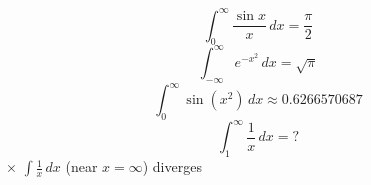 \documentclass[11pt,a4paper]{article}
\theoremstyle{plain}
\theoremstyle{definition}
\theoremstyle{remark}
\begin{document}
\begin{equation*}
  \int_0^{\infty} \frac{\sin x}{x}\,dx = \frac{\pi}{2}
\end{equation*}
\begin{equation*}
  \int_{-\infty}^{\infty} e^{-x^2}\,dx = \sqrt{\pi}
\end{equation*}
\begin{equation*}
  \int_0^{\infty} \sin(x^2)\,dx \approx 0.6266570687
\end{equation*}
\begin{equation*}
  \int_1^{\infty} \frac{1}{x}\,dx = ?
\end{equation*}
{\small\color{red!60!black}$\times$ $\int \frac{1}{x} \, dx$ (near $x = \infty$) diverges}
\end{document}
